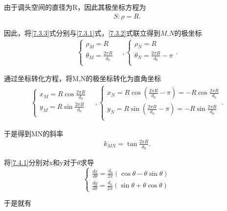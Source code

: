 \documentclass[../main.tex]{subfiles}
\begin{document}
    \par 由于调头空间的直径为R，因此其极坐标方程为
    \begin{align}
        S:\rho =R. \label{7.3.3} 
    \end{align}
    \par 因此，将\eqref{7.3.3}式分别与\eqref{7.3.1}式，\eqref{7.3.2}式联立得到$M$,$N$的极坐标
    \begin{gather}\label{1.........40}
        \begin{cases}
        \rho _M=R\\
        \theta _M=\frac{2\pi R}{d_0}\\
        \end{cases}
        \quad,
        \begin{cases}
        \rho _N=R\\
        \theta _N=\frac{2\pi R}{d_0}-\pi \\
        \end{cases}.
        \end{gather}
   \par 通过坐标转化方程，将M,N的极坐标转化为直角坐标
   \begin{gather}\label{1.........42}
    \begin{cases}
        x_M = R\cos\frac{2\pi R}{d_0}\\
        y_M = R\sin\frac{2\pi R}{d_0}\\
    \end{cases}
    \quad,
    \begin{cases}
        x_N = R\cos(\frac{2\pi R}{d_0}-\pi)= - R\cos\frac{2\pi R}{d_0}\\
        y_N = R\sin(\frac{2\pi R}{d_0}-\pi)= - R\sin\frac{2\pi R}{d_0}
         \\
    \end{cases}.
    \end{gather}
    \par 于是得到MN的斜率
    \begin{align}
        k_{MN}=\tan\frac{2\pi R}{d_0}.\label{7.3.4}
        \end{align}
    \par 将\eqref{7.4.1}分别对x和y对于$\theta $求导
    \[
\begin{cases}\label{1.........44}
\frac{dx}{d\theta} = \frac{d_0}{2\pi} (\cos\theta - \theta\sin\theta) \\
\frac{dy}{d\theta} = \frac{d_0}{2\pi} (\sin\theta + \theta\cos\theta)
\end{cases}
\]
\par 于是就有
\end{document}
